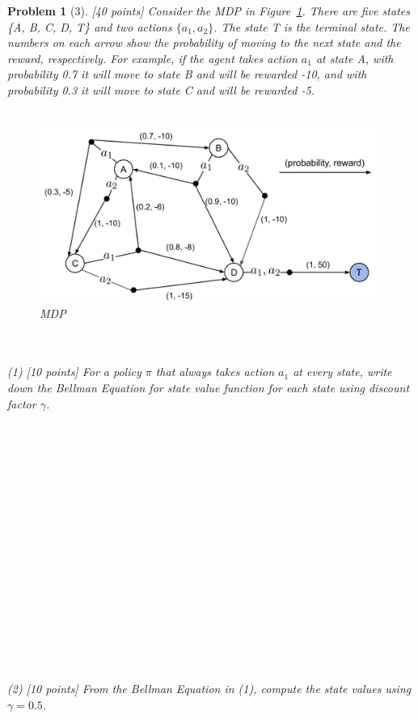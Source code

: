 \documentclass[12pt]{article}
\theoremstyle{quest}
\newtheorem*{problem}{Problem}
\begin{document}
\begin{problem}[3] [40 points]
Consider the MDP in Figure~\ref{fig:mdp_rl}. There are five states \{A, B, C, D, T\} and two actions $\{a_1,a_2\}$. The state T is the terminal state. The numbers on each arrow show the probability of moving to the next state and the reward, respectively. For example, if the agent takes action $a_1$ at state A, with probability 0.7 it will move to state B  and will be rewarded -10, and with probability 0.3 it will move to state C and will be rewarded -5.
\\\\
\begin{figure}[h!]
\centering
  \includegraphics[width=.9\textwidth]{mdp_example.png}
  \caption{MDP}
  \label{fig:mdp_rl}
\end{figure}
\noindent
\\\\
(1) [10 points] For a policy $\pi$ that always takes action $a_1$ at every state, write down the Bellman Equation for state value function for each state using discount factor $\gamma$.\\\\\\\\\\\\\\\\\\\\\\\\\\\\\\\\\\\\
(2) [10 points] From the Bellman Equation in (1), compute the state values using \underline{$\gamma=0.5$}.\\\\\\\\\\\\\\\\\\\\\\\\\\\\\\

\end{problem}
\end{document}
